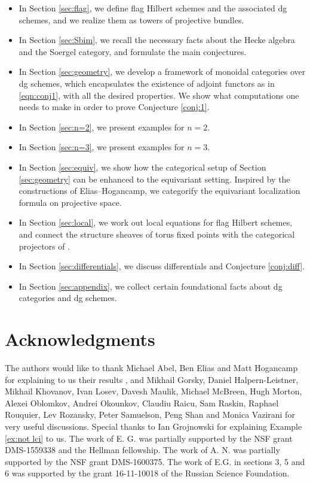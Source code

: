 \documentclass[12pt]{amsart}
\numberwithin{equation}{section}
\theoremstyle{definition}
\theoremstyle{remark}
\renewcommand{\1}{\mathbf{1}}
\begin{document}
\begin{itemize}

\item In Section \ref{sec:flag}, we define flag Hilbert schemes and the associated dg schemes, and we realize them as towers of projective bundles. 

\item In Section \ref{sec:Sbim}, we recall the necessary facts about the Hecke algebra and the Soergel category, and formulate the main conjectures.

\item In Section \ref{sec:geometry}, we develop a framework of monoidal categories over dg schemes, which encapsulates the existence of adjoint functors as in \eqref{eqn:conj1}, with all the desired properties. We show what computations one needs to make in order to prove Conjecture \ref{conj:1}.

\item In Section \ref{sec:n=2}, we present examples for $n=2$.

\item In Section \ref{sec:n=3}, we present examples for $n=3$.

\item In Section \ref{sec:equiv}, we show how the categorical setup of Section \ref{sec:geometry} can be enhanced to the equivariant setting. Inspired by the constructions of Elias--Hogancamp, we categorify the equivariant localization formula on projective space.

\item In Section \ref{sec:local}, we work out local equations for flag Hilbert schemes, and connect the structure sheaves of torus fixed points with the categorical projectors of \cite{EH}.

\item In Section \ref{sec:differentials}, we discuss differentials and Conjecture \ref{conj:diff}.

\item In Section \ref{sec:appendix}, we collect certain foundational facts about dg categories and dg schemes.

\end{itemize}


\section*{Acknowledgments}

The authors would like to thank Michael Abel, Ben Elias and Matt Hogancamp for explaining to us their results \cite{AbHog,EH,Hog}, and Mikhail Gorsky, Daniel Halpern-Leistner, Mikhail Khovanov, Ivan Losev, Davesh Maulik, Michael McBreen, Hugh Morton, Alexei Oblomkov, Andrei Okounkov, Claudiu Raicu, Sam Raskin, Raphael Rouquier, Lev Rozansky, Peter Samuelson, Peng Shan and Monica Vazirani for very useful discussions. Special thanks to Ian Grojnowski for explaining Example \ref{ex:not lci} to us. The work of E. G. was partially supported by the NSF grant DMS-1559338 and the Hellman fellowship. The work of A. N. was partially supported by the NSF grant DMS-1600375.
The work of E.G. in sections 3, 5 and 6 was supported by the grant 16-11-10018 of the Russian Science Foundation.
\end{document}
